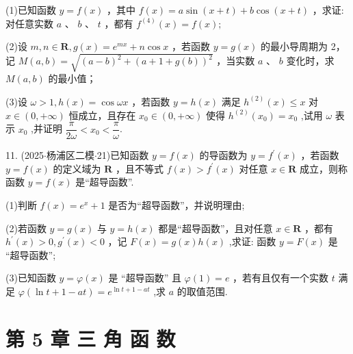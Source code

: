 (1)已知函数 $y = f\left( x\right)$ ，其中 $f\left( x\right)  = a\sin \left( {x + t}\right)  + b\cos \left( {x + t}\right)$ ，求证:对任意实数 $a$ 、 $b$ 、 $t$ ，都有 ${f}^{\left( 4\right) }\left( x\right)  = f\left( x\right) ;$

(2)设 $m,n \in  \mathbf{R},g\left( x\right)  = {{e}}^{mx} + n\cos x$ ，若函数 $y = g\left( x\right)$ 的最小导周期为 2，记 $M\left( {a,b}\right)  =  \sqrt{{\left( a - b\right) }^{2} + {\left( a + 1 + g\left( b\right) \right) }^{2}}$ ，当实数 $a$ 、 $b$ 变化时，求 $M\left( {a,b}\right)$ 的最小值；

(3)设 $\omega  > 1,h\left( x\right)  = \cos {\omega x}$ ，若函数 $y = h\left( x\right)$ 满足 ${h}^{\left( 2\right) }\left( x\right)  \leq  x$ 对 $x \in  \left( {0, + \infty }\right)$ 恒成立，且存在 ${x}_{0} \in  \left( {0, + \infty }\right)$ 使得 ${h}^{\left( 2\right) }\left( {x}_{0}\right)  = {x}_{0}$ ,试用 $\omega$ 表示 ${x}_{0}$ ,并证明 $\dfrac{\pi }{2\omega } < {x}_{0} < \dfrac{\pi }{\omega }$.

11. (2025$\cdot$杨浦区二模$\cdot$21)已知函数 $y = f\left( x\right)$ 的导函数为 $y = {f}^{\prime }\left( x\right)$ ，若函数 $y = f\left( x\right)$ 的定义域为 $\mathbf{R}$ ，且不等式 $f\left( x\right)  > {f}^{\prime }\left( x\right)$ 对任意 $x \in  \mathbf{R}$ 成立，则称函数 $y = f\left( x\right)$ 是“超导函数”.

(1)判断 $f\left( x\right)  = {{e}}^{x} + 1$ 是否为“超导函数”，并说明理由;

(2)若函数 $y = g\left( x\right)$ 与 $y = h\left( x\right)$ 都是“超导函数”，且对任意 $x \in  \mathbf{R}$ ，都有 ${h}^{\prime }\left( x\right)  > 0,{g}^{\prime }\left( x\right)  < 0$ ，记 $F\left( x\right)  = g\left( x\right) h\left( x\right)$ ,求证: 函数 $y = F\left( x\right)$ 是 “超导函数”;

(3)已知函数 $y = \varphi \left( x\right)$ 是 “超导函数” 且 $\varphi \left( 1\right)  = {e}$ ，若有且仅有一个实数 $t$ 满足 $\varphi \left( {\ln t + 1 - {at}}\right)  =  {{e}}^{\ln t + 1 - {at}}$ ,求 $a$ 的取值范围.

\section*{第 5 章 三 角 函 数}

